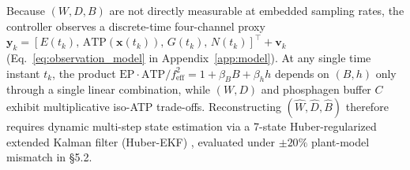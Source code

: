 \documentclass[11pt]{article}
\theoremstyle{plain}
\theoremstyle{remark}
\begin{document}
Because $(W, D, B)$ are not directly measurable at embedded sampling rates, the controller observes a discrete-time four-channel proxy $\mathbf{y}_k = [E(t_k),\, \mathrm{ATP}(\mathbf{x}(t_k)),\, G(t_k),\, N(t_k)]^\top + \mathbf{v}_k$ (Eq.~\ref{eq:observation_model} in Appendix~\ref{app:model}). At any single time instant $t_k$, the product $\mathrm{EP}\cdot\mathrm{ATP}/f_{\mathrm{eff}}^2 = 1 + \beta_B B + \beta_h h$ depends on $(B, h)$ only through a single linear combination, while $(W, D)$ and phosphagen buffer $C$ exhibit multiplicative iso-ATP trade-offs. Reconstructing $(\hat{W}, \hat{D}, \hat{B})$ therefore requires dynamic multi-step state estimation via a 7-state Huber-regularized extended Kalman filter (Huber-EKF) \cite{kalman1960new,huber1964robust}, evaluated under $\pm 20\%$ plant-model mismatch in \S5.2.
\end{document}
